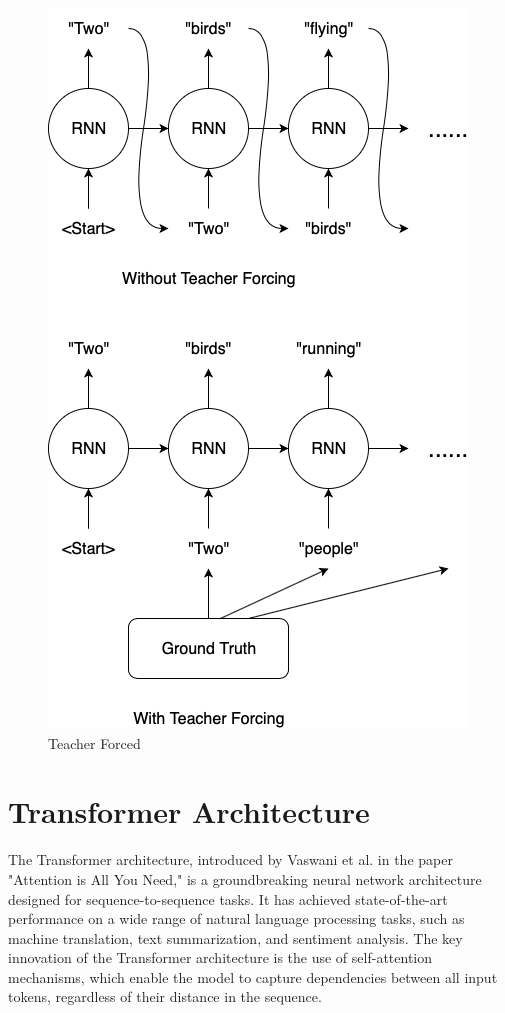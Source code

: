 \documentclass[12pt]{article}
\begin{document}
\begin{figure}[h]
    \centering
    \includegraphics[scale=0.3]{./media/teacher.png}
    \caption{Teacher Forced}
    \label{fig:teacher}
\end{figure}

\section{Transformer Architecture}

The Transformer architecture, introduced by Vaswani et al. in the paper "Attention is All You Need," is a groundbreaking neural network architecture designed for sequence-to-sequence tasks. It has achieved state-of-the-art performance on a wide range of natural language processing tasks, such as machine translation, text summarization, and sentiment analysis. The key innovation of the Transformer architecture is the use of self-attention mechanisms, which enable the model to capture dependencies between all input tokens, regardless of their distance in the sequence.
\end{document}
